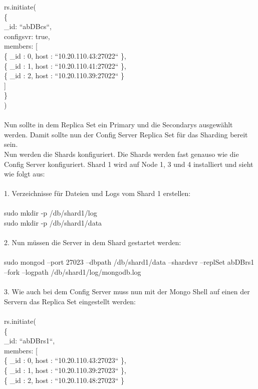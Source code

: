rs.initiate( \\
\{ \\
    \_id: “abDBcs“, \\
    configsvr: true, \\
    members: [ \\
      \{ \_id : 0, host : “10.20.110.43:27022“ \}, \\
      \{ \_id : 1, host : “10.20.110.41:27022“ \}, \\
      \{ \_id : 2, host : “10.20.110.39:27022“ \} \\
    ] \\
  \} \\
) \\
\\
Nun sollte in dem Replica Set ein Primary und die Secondarys ausgew\"ahlt werden. Damit sollte nun der Config Server Replica Set f\"ur das Sharding bereit sein.
\\
Nun werden die Shards konfiguriert. Die Shards werden fast genauso wie die Config Server konfiguriert. Shard 1 wird auf Node 1, 3 und 4 installiert und sieht wie folgt aus:
\\
\\
1.	Verzeichnisse f\"ur Dateien und Logs vom Shard 1 erstellen:
\\
\\
sudo mkdir -p /db/shard1/log
\\
sudo mkdir -p /db/shard1/data
\\
\\
2.	Nun m\"ussen die Server in dem Shard gestartet werden:
\\
\\
sudo mongod --port 27023 --dbpath /db/shard1/data --shardsvr --replSet abDBrs1 --fork --logpath /db/shard1/log/mongodb.log
\\
\\
3.	Wie auch bei dem Config Server muss nun mit der Mongo Shell auf einen der Servern das Replica Set eingestellt werden:
\\
\\
rs.initiate( \\
  \{ \\
  \_id: “abDBrs1“, \\
    members: [ \\
      \{ \_id : 0, host : “10.20.110.43:27023“ \}, \\
      \{ \_id : 1, host : “10.20.110.39:27023“ \}, \\
      \{ \_id : 2, host : “10.20.110.48:27023“ \} \\
